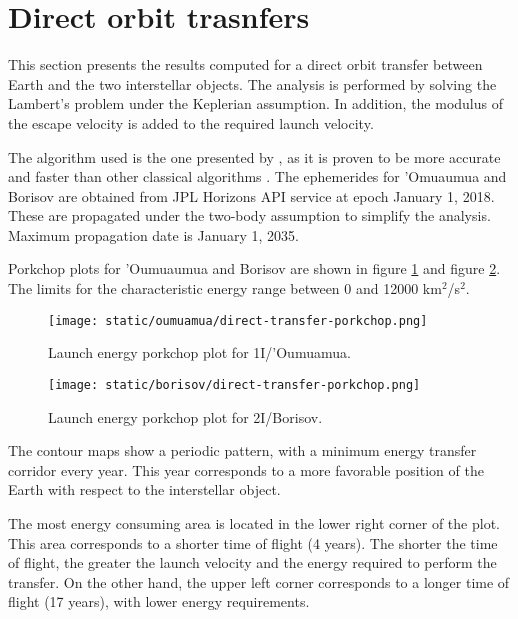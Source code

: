\section{Direct orbit trasnfers}

This section presents the results computed for a direct orbit transfer between
Earth and the two interstellar objects. The analysis is performed by solving the
Lambert's problem under the Keplerian assumption. In addition, the modulus of the
escape velocity is added to the required launch velocity.

The algorithm used is the one presented by \cite{izzo2015}, as it is proven to
be more accurate and faster than other classical algorithms \cite{martinez2021}.
The ephemerides for 'Omuaumua and Borisov are obtained from JPL Horizons API
service at epoch January 1, 2018. These are propagated under the two-body
assumption to simplify the analysis. Maximum propagation date is January 1,
2035.

Porkchop plots for 'Oumuaumua and Borisov are shown in figure
\ref{fig:oumuamua-direct-transfer-porkchop} and figure
\ref{fig:borisov-direct-transfer-porkchop}. The limits for the characteristic
energy range between 0 and 12000 km$^2$/s$^2$.

\begin{figure}[H]
  \centering
  \texttt{[image: static/oumuamua/direct-transfer-porkchop.png]}
  \caption{Launch energy porkchop plot for 1I/'Oumuamua.}
  \label{fig:oumuamua-direct-transfer-porkchop}
\end{figure}
\begin{figure}[H]
  \centering
  \texttt{[image: static/borisov/direct-transfer-porkchop.png]}
  \caption{Launch energy porkchop plot for 2I/Borisov.}
  \label{fig:borisov-direct-transfer-porkchop}
\end{figure}

The contour maps show a periodic pattern, with a minimum energy transfer
corridor every year. This year corresponds to a more favorable position of the
Earth with respect to the interstellar object.

The most energy consuming area is located in the lower right corner of the plot.
This area corresponds to a shorter time of flight (4 years). The shorter the time of
flight, the greater the launch velocity and the energy required to perform the
transfer. On the other hand, the upper left corner corresponds to a longer time
of flight (17 years), with lower energy requirements.

